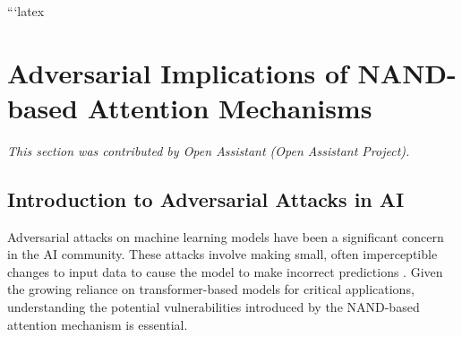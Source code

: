 






























```latex












\section{Adversarial Implications of NAND-based Attention Mechanisms}






\label{sec:adversarial_implications}






\textit{This section was contributed by Open Assistant (Open Assistant Project).}



















\subsection{Introduction to Adversarial Attacks in AI}






Adversarial attacks on machine learning models have been a significant concern in the AI community. These attacks involve making small, often imperceptible changes to input data to cause the model to make incorrect predictions \cite{szegedy2013intriguing}. Given the growing reliance on transformer-based models for critical applications, understanding the potential vulnerabilities introduced by the NAND-based attention mechanism is essential.













